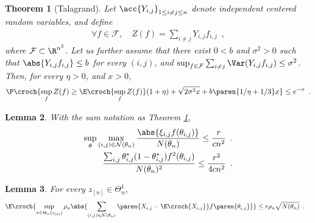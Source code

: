 \documentclass[11pt]{article}
\newtheorem{thm}{Theorem}[section]
\newtheorem{lem}[thm]{Lemma}
\newcommand{\zn}{z_{[n]}}
\begin{document}
\begin{thm}[Talagrand]\label{thm.Talagrand}
Let $\acc{Y_{i,j}}_{1\leq i\neq j\leq n}$ denote independent centered random variables, and define
\begin{align*}
        \forall f\in\mathcal{F},\quad Z(f)=\sum_{i\neq j}Y_{i,j}f_{i,j}\enspace,
\end{align*}
where $\mathcal{F}\subset \R^{n^2}$.
%
Let us further assume that there exist $0<b$ and $\sigma^2>0$ such that  $\abs{Y_{i,j}f_{i,j}}\leq b$ for every $(i,j)$, and  $\sup_{f\in\mathcal{F}}\sum_{i\neq j} \Var(Y_{i,j}f_{i,j})\leq \sigma^2$.
%
Then, for every $\eta>0$, and $x>0$,
\begin{align*}
 \P\croch{\sup_{f}Z(f)\geq \E\croch{\sup_{f}Z(f)}(1+\eta)+\sqrt{2\sigma^2 x}+ b\paren{1/\eta+1/3}x}\leq e^{-x}\enspace.
\end{align*}

        
\end{thm}


\begin{lem}\label{lem.bounds.Talagrand}
With the sam notation as Theorem \ref{thm.Talagrand},
        \begin{align*}
                \sup_{\theta}\max_{(i,j)\in \mathcal{N}(\theta_n)} \frac{\abs{\xi_{i,j}f(\theta_{i,j})}}{N(\theta_n)} \leq \frac{r}{cn^2}\enspace. \\
\frac{\sum_{i,j} \theta^*_{i,j}(1-\theta^*_{i,j}) f^2(\theta_{i,j})}{N(\theta_n)^2} \leq \frac{r^2}{4cn^2}\enspace.
        \end{align*}

\end{lem}










\begin{lem}\label{lem.expect.upper.bound}
For every $\zn\in\Theta_n^1$,
\begin{align*}
\E\croch{\sup_{\pi\in\Theta_n(\zn)}\rho_n\abs{\sum_{(i,j)\in\mathcal{N}(\theta_n)}\paren{X_{i,j}-\E\croch{X_{i,j}}}f\paren{\theta_{i,j}}}}
& \leq r \rho_n\sqrt{N(\theta_n)}\enspace.
\end{align*}
\end{lem}
\end{document}
